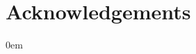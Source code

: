 \chapter*{Acknowledgements}             %

\iftoggle{usemicrotype}                 %
  {\microtypesetup{protrusion=false}}%
  {}
\clearpage                              %
\contentslistsetup                      %

\pagestyle{ASUtoc}
\tableofcontents*                       %
  {\setlength{\cftchapterindent}%
    {0em}%
  } 

\clearpage
\pagestyle{ASUlot}
\listoftables                           %

\clearpage
\pagestyle{ASUlof}
\listoffigures                          %

  {\setlength{\cftchapterindent}%
    {\levelindentincrement}%
  } 
\setlength{\afterchapskip}%
  {\baselineskip}                       %

{}    %
{}%
  {\protect{}}    %

